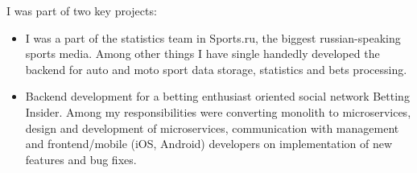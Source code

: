 I was part of two key projects:

\begin{itemize}
    \item I was a part of the statistics team in Sports.ru, the biggest russian-speaking sports media. 
        Among other things I have single handedly developed the backend for auto and moto sport data storage, statistics and bets processing.
    \item Backend development for a betting enthusiast oriented social network Betting Insider. 
        Among my responsibilities were converting monolith to microservices, design and development of microservices, 
        communication with management and frontend/mobile (iOS, Android) developers on implementation of new features and bug fixes.
\end{itemize}
